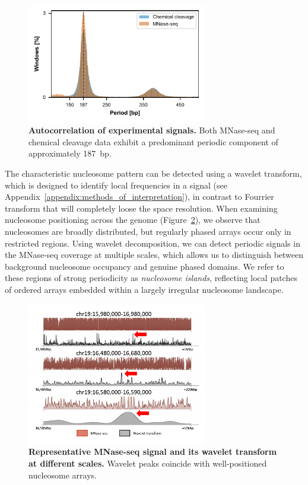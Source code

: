 \documentclass[11pt]{book}
\begin{document}
\begin{figure}[htbp]
\centering
\includegraphics[width=0.7\textwidth]{Figures/Results/autocorr_wg_2sig.pdf}
\caption{\textbf{Autocorrelation of experimental signals.} Both MNase-seq and chemical cleavage data exhibit a predominant periodic component of approximately 187~bp.}
\label{fig:mnase_autocor}
\end{figure}

The characteristic nucleosome pattern can be detected using a wavelet transform, which is designed to identify local frequencies in a signal (see Appendix~\ref{appendix:methods_of_interpretation}), in contrast to Fourrier transform that will completely loose the space resolution. When examining nucleosome positioning across the genome (Figure~\ref{fig:wavelet_sig}), we observe that nucleosomes are broadly distributed, but regularly phased arrays occur only in restricted regions. Using wavelet decomposition, we can detect periodic signals in the MNase-seq coverage at multiple scales, which allows us to distinguish between background nucleosome occupancy and genuine phased domains. We refer to these regions of strong periodicity as \emph{nucleosome islands}, reflecting local patches of ordered arrays embedded within a largely irregular nucleosome landscape.


\begin{figure}[htbp]
\centering
\includegraphics[width=0.7\textwidth]{Figures/Results/wavelet_sig.pdf}
\caption{\textbf{Representative MNase-seq signal and its wavelet transform at different scales.} Wavelet peaks coincide with well-positioned nucleosome arrays.}
\label{fig:wavelet_sig}
\end{figure}
\end{document}
